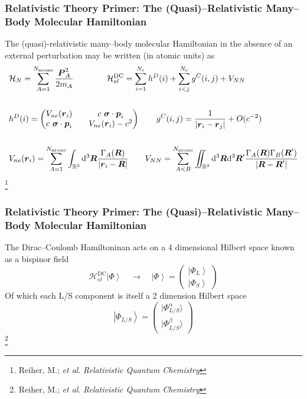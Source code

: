 \documentclass[usepdftitle=false,10pt]{beamer}
\newcommand{\ket}[1]{\left\vert #1 \right\rangle}         %
\newcommand*\vc[1]{\boldsymbol{#1}}
\newcommand*\op[1]{\mathcal{#1}}
\renewcommand*\iint[0]{\int\hspace{-8pt}\int}
\newcommand\blfootnote[1]{%
  \begingroup
  \renewcommand\thefootnote{}\footnote{#1}%
  \addtocounter{footnote}{-1}%
  \endgroup
}
\begin{document}
\begin{frame}
  \frametitle{Relativistic Theory Primer: The (Quasi)--Relativistic Many--Body 
  Molecular Hamiltonian}

  The (quasi)-relativistic many--body molecular Hamiltonian in the absence of 
  an external perturbation may be written (in atomic units) as
  \begin{align*}
    &\op{H}_N = \sum_{A=1}^{N_\mathrm{atoms}} \frac{\vc{P}^2_A}{2m_A} \qquad\qquad
     \op{H}^\mathrm{DC}_{el} = 
       \sum_{i=1}^{N_e} h^D(i) + \sum_{i < j}^{N_e} g^C(i,j) + V_{NN} \\
    \\
    & h^D(i) = 
      \begin{pmatrix}
        V_{ne}(\vc{r}_i) && c\text{ }\vc{\sigma} \cdot \vc{p}_i\\
	c\text{ }\vc{\sigma} \cdot \vc{p}_i && V_{ne}(\vc{r}_i) - c^2
      \end{pmatrix} \qquad 
      g^C(i,j) = \frac{1}{\vert \vc{r}_i - \vc{r}_j\vert} + O(c^{-2})
      \\ \\ 
    & V_{ne}(\vc{r}_i) = \sum_{A=1}^{N_\mathrm{atoms}}
                    \int_{\mathbb{R}^3}\mathrm{d}^3\vc{R}
		    \frac{\Gamma_A(\vc{R})}{\vert \vc{r}_i - \vc{R}\vert}
      \qquad V_{NN} = \sum_{A<B}^{N_\mathrm{atoms}}
                    \iint_{\mathbb{R}^3}\mathrm{d}^3\vc{R}\mathrm{d}^3\vc{R}'
		    \frac{\Gamma_A(\vc{R})\Gamma_B(\vc{R}')}
		         {\vert \vc{R} - \vc{R}'\vert}
  \end{align*}
  \blfootnote{\tiny Reiher, M.; \emph{et al}. \emph{Relativistic Quantum Chemistry}}
\end{frame}

\begin{frame}
  \frametitle{Relativistic Theory Primer: The (Quasi)--Relativistic Many--Body 
  Molecular Hamiltonian}

  The Dirac--Coulomb Hamiltoninan acts on a 4 dimensional Hilbert space
  known as a bispinor field
  \begin{equation*}
    \op{H}_{el}^\mathrm{DC} \ket{\Phi} \quad \rightarrow \quad 
    \ket{\Phi} = \begin{pmatrix} \ket{\Phi_L} \\ \ket{\Phi_S} \end{pmatrix}
  \end{equation*}
  Of which each L/S component is itself a 2 dimension Hilbert space
  \begin{equation*}
    \ket{\Phi_{L/S}} =
      \begin{pmatrix} \vert\Phi_{L/S}^\alpha\rangle \\ \vert\Phi_{L/S}^\beta\rangle
      \end{pmatrix}
  \end{equation*}
  \blfootnote{\tiny Reiher, M.; \emph{et al}. \emph{Relativistic Quantum Chemistry}}

\end{frame}
\end{document}
